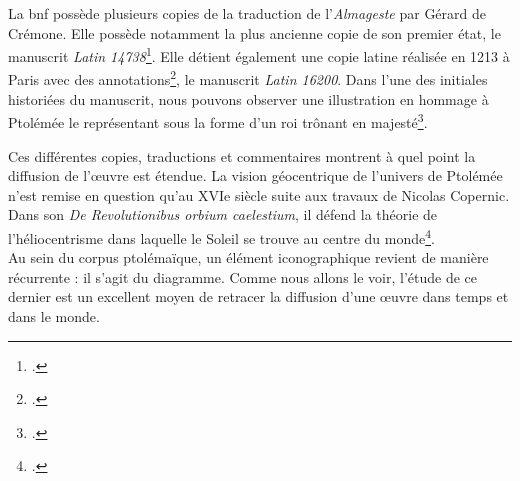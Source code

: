 La \gls{bnf} possède plusieurs copies de la traduction de l'\textit{Almageste} par Gérard de Crémone. Elle possède notamment la plus ancienne copie de son premier état, le manuscrit \textit{Latin 14738}\footcite{jacquartTraductionsAuFil2018}. Elle détient également une copie latine réalisée en 1213 à Paris avec des annotations\footcite{ptolemaeusPtolomeusAlmagestumTransl1213}, le manuscrit \textit{Latin 16200}. 
Dans l'une des initiales historiées du manuscrit, nous pouvons observer une illustration en hommage  à Ptolémée le représentant sous la forme d'un roi trônant en majesté\footcite{TraductionLatineLAlmageste}. 

Ces différentes copies, traductions et commentaires montrent à quel point la diffusion de l'œuvre est étendue.
La vision géocentrique de l'univers de Ptolémée n'est remise en question qu'au XVIe siècle suite aux travaux de Nicolas Copernic.
Dans son \textit{De Revolutionibus orbium caelestium}, il défend la théorie de l'héliocentrisme dans laquelle le Soleil se trouve au centre du monde\footcite{verdetHELIOCENTRISME2008}. \\

Au sein du corpus ptolémaïque, un élément iconographique revient de manière récurrente : il s'agit du diagramme.
Comme nous allons le voir, l'étude de ce dernier est un excellent moyen de retracer la diffusion d'une œuvre dans temps et dans le monde.
